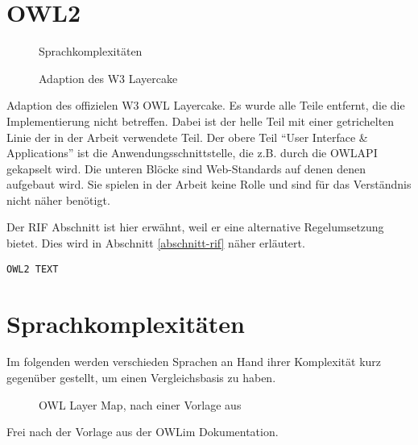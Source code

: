 \section{OWL2}
\label{abschnitt-owl2}

\begin{figure}[htb]
	\caption{Sprachkomplexitäten}
	\label{image-sprachhierarchie}
	\begin{center}
    \end{center}
\end{figure}

\begin{figure}[htb]
	\caption{Adaption des W3 Layercake\cite{W3SWLayerCake}}
	\label{image-w3-layercake}
	\begin{center}
	\end{center}
\end{figure}

Adaption des offizielen W3 OWL Layercake\cite{W3SWLayerCake}. Es wurde alle Teile entfernt, die die Implementierung nicht betreffen. Dabei ist der helle Teil mit einer getrichelten Linie der in der Arbeit verwendete Teil. Der obere Teil ``User Interface \& Applications'' ist die Anwendungsschnittstelle, die z.B. durch die OWLAPI gekapselt wird. Die unteren Blöcke sind Web-Standards auf denen denen aufgebaut wird. Sie spielen in der Arbeit keine Rolle und sind für das Verständnis nicht näher benötigt.

Der RIF Abschnitt ist hier erwähnt, weil er eine alternative Regelumsetzung bietet. Dies wird in Abschnitt \ref{abschnitt-rif} näher erläutert.

\begin{verbatim}
OWL2 TEXT
\end{verbatim}


\section{Sprachkomplexitäten}
Im folgenden werden verschieden Sprachen an Hand ihrer Komplexität kurz gegenüber gestellt, um einen Vergleichsbasis zu haben.

\begin{figure}[htb]
	\caption{OWL Layer Map, nach einer Vorlage aus \cite{OWLimLayerMap}}
	\label{image-owl-layer-map}
	\begin{center}
	\end{center}
\end{figure}
Frei nach der Vorlage aus der OWLim Dokumentation.

